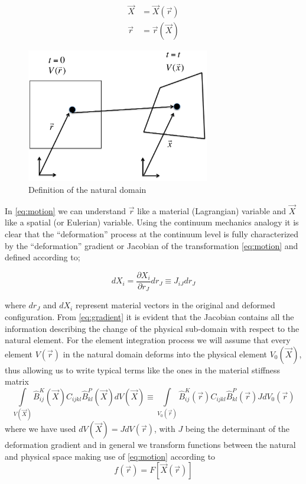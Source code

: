 \begin{equation}
\begin{aligned}
\vec{X}&=\vec{X}(\vec{r})\\
\vec{r}&=\vec{r}(\vec{X})
\end{aligned}
\label{eq:motion}
\end{equation}

\begin{figure}[h]
\centering
\includegraphics[width=8cm]{img/figure1.pdf}
\caption{Definition of the natural domain}
\label{fig:natural domain}
\end{figure}

 

In \cref{eq:motion} we can understand $\vec{r}$ like a material (Lagrangian) variable and $\vec{X}$ like a spatial (or Eulerian) variable. Using the continuum mechanics analogy it is clear that the ``deformation'' process at the continuum level is fully characterized by the ``deformation'' gradient or Jacobian of the transformation \cref{eq:motion} and defined according to;

\begin{equation}
dX_i=\dfrac{\partial X_i}{\partial r_J}dr_J\equiv J_{iJ}dr_{J}
\label{eq:gradient}
\end{equation}

where $dr_{J}$ and $dX_i$ represent material vectors in the original and deformed configuration. From \cref{eq:gradient} it is evident that the Jacobian contains all the information describing the change of the physical sub-domain with respect to the natural element. For the element integration process we will assume that every element $V(\vec{r})$ in the natural domain deforms into the physical element $V_0(\vec{X})$, thus allowing us to write typical terms like the ones in the material stiffness matrix
\begin{equation}
\int\limits_{V(\vec{X})} \hat{B}_{ij}^K(\vec{X}) C_{ijkl} \hat{B}_{kl}^P(\vec{X}) dV(\vec{X})\equiv \int\limits_{V_0(\vec{r})} \hat{B}_{ij}^K(\vec{r}) C_{ijkl} \hat{B}_{kl}^P(\vec{r})J dV_0(\vec{r})
\label{eq:matmatrix}
\end{equation}
where we have used $dV(\vec{X})=JdV(\vec{r})$, with $J$ being the determinant of the deformation gradient and in general we transform functions between the natural and physical space making use of \cref{eq:motion} according to
\begin{equation}
f(\vec{r})=F[\vec{X}(\vec{r})]
\label{eq:funtrans}
\end{equation}

